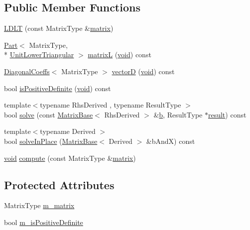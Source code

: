 \subsection*{Public Member Functions}
\begin{DoxyCompactItemize}
\item 
\hyperlink{class_l_d_l_t_a69a5fb2ee283c712267f4908cb450f44}{L\-D\-L\-T} (const Matrix\-Type \&\hyperlink{glext_8h_a7b24a3f2f56eb1244ae69dacb4fecb6f}{matrix})
\item 
\hyperlink{class_part}{Part}$<$ Matrix\-Type, \\*
\hyperlink{_constants_8h_ac31aa3a2f1ccd58323458472600531f7}{Unit\-Lower\-Triangular} $>$ \hyperlink{class_l_d_l_t_a000ce3cd750ad699c311fb39d8d98aed}{matrix\-L} (\hyperlink{group___u_a_v_objects_plugin_ga444cf2ff3f0ecbe028adce838d373f5c}{void}) const 
\item 
\hyperlink{class_diagonal_coeffs}{Diagonal\-Coeffs}$<$ Matrix\-Type $>$ \hyperlink{class_l_d_l_t_ac35e8ccbfd3463f071b8b29ad972fc74}{vector\-D} (\hyperlink{group___u_a_v_objects_plugin_ga444cf2ff3f0ecbe028adce838d373f5c}{void}) const 
\item 
bool \hyperlink{class_l_d_l_t_ad49617ab9a0c83461910f7c834aabff7}{is\-Positive\-Definite} (\hyperlink{group___u_a_v_objects_plugin_ga444cf2ff3f0ecbe028adce838d373f5c}{void}) const 
\item 
{\footnotesize template$<$typename Rhs\-Derived , typename Result\-Type $>$ }\\bool \hyperlink{class_l_d_l_t_ae92ab0214f18760d9dfadcceb7616b6c}{solve} (const \hyperlink{class_matrix_base}{Matrix\-Base}$<$ Rhs\-Derived $>$ \&\hyperlink{glext_8h_a6eba317e3cf44d6d26c04a5a8f197dcb}{b}, Result\-Type $\ast$\hyperlink{qxtslotjob_8h_aab161efab0511ea9612b64c40e9852ca}{result}) const 
\item 
{\footnotesize template$<$typename Derived $>$ }\\bool \hyperlink{class_l_d_l_t_a485d56a7389f2bf2cb5406204b342a95}{solve\-In\-Place} (\hyperlink{class_matrix_base}{Matrix\-Base}$<$ Derived $>$ \&b\-And\-X) const 
\item 
\hyperlink{group___u_a_v_objects_plugin_ga444cf2ff3f0ecbe028adce838d373f5c}{void} \hyperlink{class_l_d_l_t_a3540c5deb41f94b60b197fce481ce498}{compute} (const Matrix\-Type \&\hyperlink{glext_8h_a7b24a3f2f56eb1244ae69dacb4fecb6f}{matrix})
\end{DoxyCompactItemize}
\subsection*{Protected Attributes}
\begin{DoxyCompactItemize}
\item 
Matrix\-Type \hyperlink{class_l_d_l_t_a48764c71819c18ade7a5dd06af9b3936}{m\-\_\-matrix}
\item 
bool \hyperlink{class_l_d_l_t_a08fa6d5609b8fe4b18f4af11d0bec528}{m\-\_\-is\-Positive\-Definite}
\end{DoxyCompactItemize}



